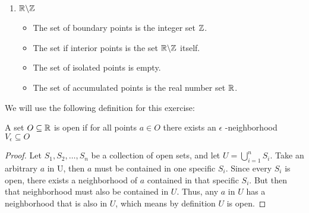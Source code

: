 \begin{enumerate}[label={(\arabic*)}]
    
    \item  \(\mathbb{R} \backslash \mathbb{Z}\)
    \begin{itemize}
        \item The set of boundary points is the integer set \(\mathbb{Z}\).
        \item The set if interior points is the set \(\mathbb{R} \backslash \mathbb{Z}\) itself.
        \item The set of isolated points is empty.
        \item The set of accumulated points is the real number set \(\mathbb{R}\).
    \end{itemize}
\end{enumerate}


 \newline

We will use the following definition for this exercise:
\begin{defi} A set \(O \subseteq \mathbb{R}\) is open if for all points \(a \in O\) there exists an \(\epsilon\) -neighborhood \(V_{\epsilon} \subseteq O\)
\end{defi}
\begin{proof}
Let \(S_1, S_2, \dots, S_n\) be a collection of open sets, and let \(U = \bigcup_{i=1}^{n} S_i\). Take an arbitrary  \(a\) in U, then \(a\) must be contained in one specific \(S_i\). Since every \(S_i\) is open, there exists a neighborhood of \(a\) contained in that specific \(S_i\). But then that neighborhood must also be contained in \(U\). Thus, any \(a\) in \(U\) has a neighborhood that is also in \(U\), which means by definition \(U\) is open.
\end{proof}

\newline

